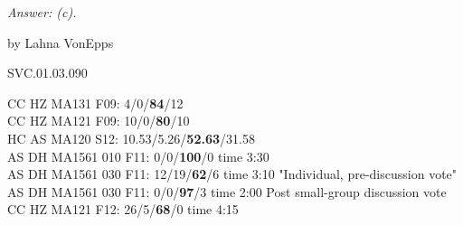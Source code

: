 
{\it Answer: (c).}

\medskip
by Lahna VonEpps

SVC.01.03.090

CC HZ MA131 F09: 4/0/{\bf84}/12  \\
CC HZ MA121 F09: 10/0/{\bf80}/10  \\
HC AS MA120 S12: 10.53/5.26/{\bf 52.63}/31.58  \\
AS DH MA1561 010 F11: 0/0/{\bf100}/0 time 3:30  \\
AS DH MA1561 030 F11: 12/19/{\bf62}/6 time 3:10 "Individual, pre-discussion vote" \\
AS DH MA1561 030 F11: 0/0/{\bf97}/3 time 2:00 Post small-group discussion vote \\
CC HZ MA121 F12: 26/5/{\bf68}/0 time 4:15  \\

